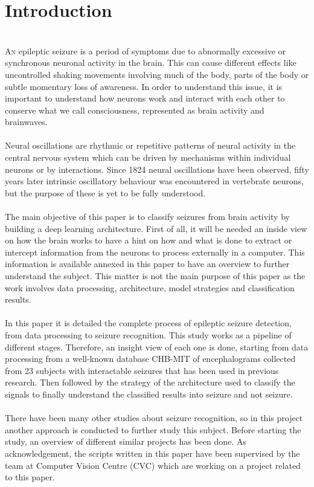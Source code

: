 ﻿\documentclass[10pt,a4paper,twocolumn,twoside]{article}
\begin{document}
\section{Introduction}
\leavevmode\\
\lettrine[lines=3]{A}{n} epileptic seizure is a period of symptoms due to abnormally excessive or synchronous neuronal activity in the brain. This can cause different effects like uncontrolled shaking movements involving much of the body, parts of the body or subtle momentary loss of awareness. In order to understand this issue, it is important to understand how neurons work and interact with each other to conserve what we call consciousness, represented as brain activity and brainwaves.
\\\\
Neural oscillations are rhythmic or repetitive patterns of neural activity in the central nervous system which can be driven by mechanisms within individual neurons or by interactions. Since 1824 neural oscillations have been observed, fifty years later intrinsic oscillatory behaviour was encountered in vertebrate neurons, but the purpose of these is yet to be fully understood.
\\\\
The main objective of this paper is to classify seizures from brain activity by building a deep learning architecture. First of all, it will be needed an inside view on how the brain works to have a hint on how and what is done to extract or intercept information from the neurons to process externally in a computer. This information is available annexed in this paper to have an overview to further understand the subject. This matter is not the main purpose of this paper as the work involves data processing, architecture, model strategies and classification results.
\\\\
In this paper it is detailed the complete process of epileptic seizure detection, from data processing to seizure recognition. This study works as a pipeline of different stages. Therefore, an insight view of each one is done, starting from data processing from a well-known database CHB-MIT of encephalograms collected from 23 subjects with interactable seizures that has been used in previous research. Then followed by the strategy of the architecture used to classify the signals to finally understand the classified results into seizure and not seizure.
\\\\
There have been many other studies about seizure recognition, so in this project another approach is conducted to further study this subject. Before starting the study, an overview of different similar projects has been done. As acknowledgement, the scripts written in this paper have been supervised by the team at Computer Vision Centre (CVC) which are working on a project related to this paper.
\end{document}
